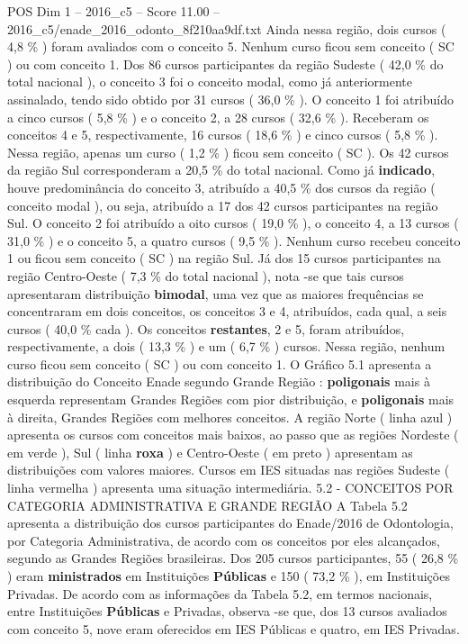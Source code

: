 \begin{textsample}{POS Dim 1 – 2016\_c5 – Score 11.00 – 2016\_c5/enade\_2016\_odonto\_8f210aa9df.txt}
Ainda nessa região, dois cursos ( 4,8 \% ) foram avaliados com o conceito 5.
Nenhum curso ficou sem conceito ( SC ) ou com conceito 1.
Dos 86 cursos participantes da região Sudeste ( 42,0 \% do total nacional ), o conceito 3 foi o conceito modal, como já anteriormente assinalado, tendo sido obtido por 31 cursos ( 36,0 \% ).
O conceito 1 foi atribuído a cinco cursos ( 5,8 \% ) e o conceito 2, a 28 cursos ( 32,6 \% ).
Receberam os conceitos 4 e 5, respectivamente, 16 cursos ( 18,6 \% ) e cinco cursos ( 5,8 \% ).
Nessa região, apenas um curso ( 1,2 \% ) ficou sem conceito ( SC ).
Os 42 cursos da região Sul corresponderam a 20,5 \% do total nacional.
Como já \textbf{indicado}, houve predominância do conceito 3, atribuído a 40,5 \% dos cursos da região ( conceito modal ), ou seja, atribuído a 17 dos 42 cursos participantes na região Sul.
O conceito 2 foi atribuído a oito cursos ( 19,0 \% ), o conceito 4, a 13 cursos ( 31,0 \% ) e o conceito 5, a quatro cursos ( 9,5 \% ).
Nenhum curso recebeu conceito 1 ou ficou sem conceito ( SC ) na região Sul.
Já dos 15 cursos participantes na região Centro-Oeste ( 7,3 \% do total nacional ), nota -se que tais cursos apresentaram distribuição \textbf{bimodal}, uma vez que as maiores frequências se concentraram em dois conceitos, os conceitos 3 e 4, atribuídos, cada qual, a seis cursos ( 40,0 \% cada ).
Os conceitos \textbf{restantes}, 2 e 5, foram atribuídos, respectivamente, a dois ( 13,3 \% ) e um ( 6,7 \% ) cursos.
Nessa região, nenhum curso ficou sem conceito ( SC ) ou com conceito 1.
O Gráfico 5.1 apresenta a distribuição do Conceito Enade segundo Grande Região : \textbf{poligonais} mais à esquerda representam Grandes Regiões com pior distribuição, e \textbf{poligonais} mais à direita, Grandes Regiões com melhores conceitos.
A região Norte ( linha azul ) apresenta os cursos com conceitos mais baixos, ao passo que as regiões Nordeste ( em verde ), Sul ( linha \textbf{roxa} ) e Centro-Oeste ( em preto ) apresentam as distribuições com valores maiores.
Cursos em IES situadas nas regiões Sudeste ( linha vermelha ) apresenta uma situação intermediária. 5.2 - CONCEITOS POR CATEGORIA ADMINISTRATIVA E GRANDE REGIÃO A Tabela 5.2 apresenta a distribuição dos cursos participantes do Enade/2016 de Odontologia, por Categoria Administrativa, de acordo com os conceitos por eles alcançados, segundo as Grandes Regiões brasileiras.
Dos 205 cursos participantes, 55 ( 26,8 \% ) eram \textbf{ministrados} em Instituições \textbf{Públicas} e 150 ( 73,2 \% ), em Instituições Privadas.
De acordo com as informações da Tabela 5.2, em termos nacionais, entre Instituições \textbf{Públicas} e Privadas, observa -se que, dos 13 cursos avaliados com conceito 5, nove eram oferecidos em IES Públicas e quatro, em IES Privadas.

\end{textsample}
